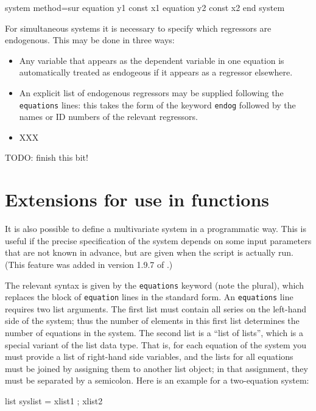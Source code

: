 \begin{code}
system method=sur
  equation y1 const x1
  equation y2 const x2
end system
\end{code}

For simultaneous systems it is necessary to specify which regressors
are endogenous. This may be done in three ways:
\begin{itemize}
\item Any variable that appears as the dependent variable in one
  equation is automatically treated as endogeous if it appears as
  a regressor elsewhere.
\item An explicit list of endogenous regressors may be supplied
  following the \texttt{equations} lines: this takes the form of the
  keyword \texttt{endog} followed by the names or ID numbers of the
  relevant regressors.
\item XXX
\end{itemize}

TODO: finish this bit!

\section{Extensions for use in functions}
\label{sec:system-functions}

It is also possible to define a multivariate system in a programmatic
way. This is useful if the precise specification of the system depends
on some input parameters that are not known in advance, but are given
when the script is actually run. (This feature was added in version
1.9.7 of .)

The relevant syntax is given by the \texttt{equations} keyword (note
the plural), which replaces the block of \texttt{equation} lines in
the standard form. An \texttt{equations} line requires two list
arguments. The first list must contain all series on the left-hand
side of the system; thus the number of elements in this first list
determines the number of equations in the system. The second list is a
``list of lists'', which is a special variant of the list data type.
That is, for each equation of the system you must provide a list of
right-hand side variables, and the lists for all equations must be
joined by assigning them to another list object; in that assignment,
they must be separated by a semicolon.  Here is an example for a
two-equation system:

\begin{code}
list syslist = xlist1 ; xlist2
\end{code}

